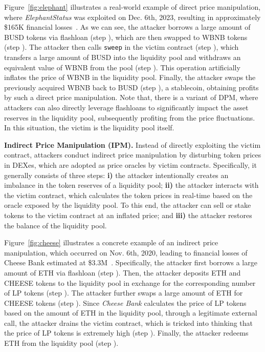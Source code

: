 Figure~\ref{fig:elephant} illustrates a real-world example of direct price manipulation, where \textit{ElephantStatus} was exploited on Dec. 6th, 2023, resulting in approximately \$165K financial losses~\cite{elephant}.
As we can see, the attacker borrows a large amount of BUSD tokens via flashloan (step ), which are then swapped to WBNB tokens (step ). The attacker then calls \texttt{sweep} in the victim contract (step ), which transfers a large amount of BUSD into the liquidity pool and withdraws an equivalent value of WBNB from the pool (step ). This operation artificially inflates the price of WBNB in the liquidity pool.
Finally, the attacker swaps the previously acquired WBNB back to BUSD (step ), a stablecoin, obtaining profits by such a direct price manipulation.
Note that,  there is a variant of DPM, where attackers can also directly leverage flashloans to significantly impact the asset reserves in the liquidity pool, subsequently profiting from the price fluctuations. In this situation, the victim is the liquidity pool itself.


\noindent
\textbf{Indirect Price Manipulation (IPM).}
\label{sec:ipm}
Instead of directly exploiting the victim contract, attackers conduct indirect price manipulation by disturbing token prices in DEXes, which are adopted as price oracles by victim contracts.
Specifically, it generally consists of three steps: \textbf{i)} the attacker intentionally creates an imbalance in the token reserves of a liquidity pool; \textbf{ii)} the attacker interacts with the victim contract, which calculates the token prices in real-time based on the oracle exposed by the liquidity pool. To this end, the attacker can sell or stake tokens to the victim contract at an inflated price; and \textbf{iii)} the attacker restores the balance of the liquidity pool.


Figure~\ref{fig:cheese} illustrates a concrete example of an indirect price manipulation, which occurred on Nov. 6th, 2020, leading to financial losses of Cheese Bank estimated at \$3.3M~\cite{cheese}.
Specifically, the attacker first borrows a large amount of ETH via flashloan (step ). Then, the attacker deposits ETH and CHEESE tokens to the liquidity pool in exchange for the corresponding number of LP tokens (step ).
The attacker further swaps a large amount of ETH for CHEESE tokens (step ).
Since \textit{Cheese Bank} calculates the price of LP tokens based on the amount of ETH in the liquidity pool, through a legitimate external call, the attacker drains the victim contract, which is tricked into thinking that the price of LP tokens is extremely high (step ).
Finally, the attacker redeems ETH from the liquidity pool (step ).

